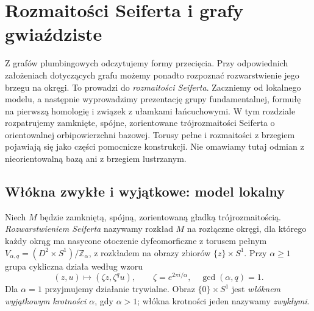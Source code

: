 \chapter{Rozmaitości Seiferta i grafy gwiaździste}
\label{ch:tg-seifert}

Z grafów plumbingowych odczytujemy formy przecięcia.
Przy odpowiednich założeniach dotyczących grafu możemy
ponadto rozpoznać rozwarstwienie jego brzegu na okręgi.
To prowadzi do \emph{rozmaitości Seiferta}. Zaczniemy od lokalnego
modelu, a następnie wyprowadzimy prezentację grupy fundamentalnej,
formułę na pierwszą homologię i związek z ułamkami łańcuchowymi.
W tym rozdziale rozpatrujemy zamknięte, spójne,
zorientowane trójrozmaitości Seiferta o orientowalnej
orbipowierzchni bazowej. Torusy pełne i rozmaitości
z brzegiem pojawiają się jako części pomocnicze
konstrukcji. Nie omawiamy tutaj odmian z nieorientowalną
bazą ani z brzegiem lustrzanym.

\section{Włókna zwykłe i wyjątkowe: model lokalny}
\label{sec:tg-seifert-model}

\begin{definicja}
Niech $M$ będzie zamkniętą, spójną, zorientowaną
gładką trójrozmaitością.
\emph{Rozwarstwieniem Seiferta} nazywamy rozkład $M$ na rozłączne
okręgi, dla którego każdy okrąg ma nasycone otoczenie dyfeomorficzne
z torusem pełnym $V_{\alpha,q}=(D^2\times S^1)/\mathbb Z_\alpha$,
z rozkładem na obrazy zbiorów $\{z\}\times S^1$.
Przy $\alpha\geq1$ grupa cykliczna działa według wzoru
\[
(z,u)\longmapsto(\zeta z,\zeta^q u),\qquad
\zeta=e^{2\pi i/\alpha},\quad \gcd(\alpha,q)=1.
\]
Dla $\alpha=1$ przyjmujemy działanie trywialne. Obraz
$\{0\}\times S^1$ jest \emph{włóknem wyjątkowym krotności $\alpha$},
gdy $\alpha>1$; włókna krotności jeden nazywamy \emph{zwykłymi}.
\end{definicja}


